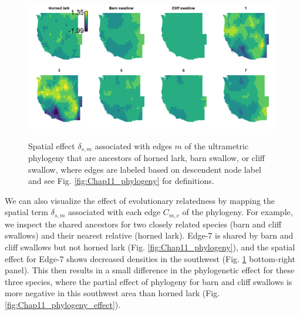 \begin{figure}[!ht]
    \caption[Phylogenetic effect for three bird species and their ancestors]{Spatial effect \(\delta_{s,m}\) associated with edges \(m\) of the ultrametric phylogeny that are ancestors of horned lark, barn swallow, or cliff swallow, where edges are labeled based on descendent node label and see Fig. \ref{fig:Chap11_phylogeny} for definitions.}
    \includegraphics[width=5.5in]{Chap_11/Ancestors.png}
    \label{fig:Chap11_ancestors}
\end{figure}

We can also visualize the effect of evolutionary relatedness by mapping the spatial term \(\delta_{s,m}\) associated with each edge \(C_{m,c}\) of the phylogeny.  For example, we inspect the shared ancestors for two closely related species (barn and cliff swallows) and their nearest relative (horned lark).  Edge-7 is shared by barn and cliff swallows but not horned lark (Fig. \ref{fig:Chap11_phylogeny}), and the spatial effect for Edge-7 shows decreased densities in the southwest (Fig. \ref{fig:Chap11_ancestors} bottom-right panel).  This then results in a small difference in the phylogenetic effect for these three species, where the partial effect of phylogeny for barn and cliff swallows is more negative in this southwest area than horned lark (Fig. \ref{fig:Chap11_phylogeny_effect}).

